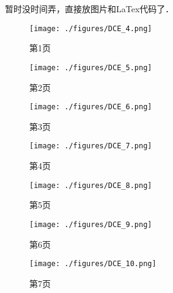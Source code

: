 
暂时没时间弄，直接放图片和LaTex代码了．
\begin{figure}[ht]
\centering
\texttt{[image: ./figures/DCE\_4.png]}
\caption{第1页} \label{DCE_fig4}
\end{figure}
\begin{figure}[ht]
\centering
\texttt{[image: ./figures/DCE\_5.png]}
\caption{第2页} \label{DCE_fig5}
\end{figure}
\begin{figure}[ht]
\centering
\texttt{[image: ./figures/DCE\_6.png]}
\caption{第3页} \label{DCE_fig6}
\end{figure}
\begin{figure}[ht]
\centering
\texttt{[image: ./figures/DCE\_7.png]}
\caption{第4页} \label{DCE_fig7}
\end{figure}
\begin{figure}[ht]
\centering
\texttt{[image: ./figures/DCE\_8.png]}
\caption{第5页} \label{DCE_fig8}
\end{figure}
\begin{figure}[ht]
\centering
\texttt{[image: ./figures/DCE\_9.png]}
\caption{第6页} \label{DCE_fig9}
\end{figure}
\begin{figure}[ht]
\centering
\texttt{[image: ./figures/DCE\_10.png]}
\caption{第7页} \label{DCE_fig10}
\end{figure}
